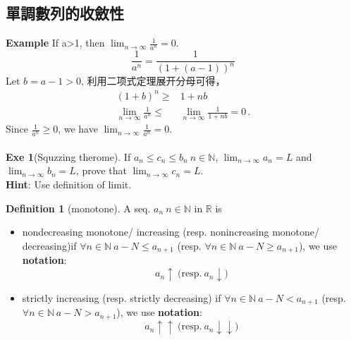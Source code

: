 \documentclass{book}
\theoremstyle{definition}
\newtheorem{definition}{Definition}[section]
\begin{document}
\subsection{單調數列的收斂性}
\noindent\textbf{Example} If a>1, then $\lim_{n \to \infty} \frac{1}{a^n}=0$.
\begin{equation}
    \frac{1}{a^n}=\frac{1}{\left(1+\left(a-1\right)\right)^n}
\end{equation}
Let $b=a-1>0$, 利用二项式定理展开分母可得，
\begin{equation}
\begin{aligned}
    \left(1+b\right)^n {\geq}& 1+nb\\
    \lim_{n \to \infty} \frac{1}{a^n} {\leq}& \lim_{n \to \infty}\frac{1}{1+nb}=0\,.
\end{aligned}
\end{equation}
Since $\frac{1}{a^n}\geq 0$, we have $\lim_{n \to \infty} \frac{1}{a^n}=0$.\\
~\\
\noindent \textbf{Exe 1}(Squzzing therome). If $a_n\leq c_n \leq b_n~n\in\mathbb{N}$, $\lim_{n \to \infty} a_n=L$ and $\lim_{n \to \infty} b_n=L$, prove that $\lim_{n \to \infty} c_n=L$.\\
\textbf{Hint}: Use definition of limit.
\begin{definition}[monotone]
    A seq. $a_n~n\in\mathbb{N}$ in $\mathbb{R}$ is 
    \begin{itemize}
        \item nondecreasing monotone/ increasing (resp. nonincreasing monotone/ decreasing)if $\forall n\in\mathbb{N}~ a-N\leq a_{n+1}$ (resp.  $\forall n\in\mathbb{N}~ a-N\geq a_{n+1}$), we use \textbf{notation}:
            \begin{equation}
                a_n \uparrow~\text{(resp.}~a_n \downarrow \text{)}
            \end{equation}
        \item strictly increasing (resp. strictly decreasing) if $\forall n\in\mathbb{N}~ a-N < a_{n+1}$ (resp.  $\forall n\in\mathbb{N}~ a-N > a_{n+1}$), we use \textbf{notation}: 
            \begin{equation}
                a_n \uparrow\uparrow~\text{(resp.}~a_n \downarrow\downarrow \text{)}
            \end{equation}
    \end{itemize}
\end{definition}
\end{document}
